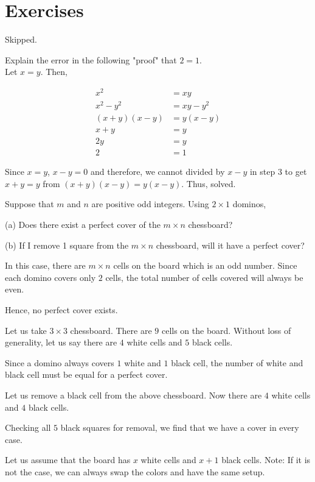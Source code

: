 \section*{Exercises}

\bp Skipped.\ep 

\bp 
  Explain the error in the following "proof" that $2 = 1$. \\
  Let $x = y$. Then,

\begin{align}
x^2 &= xy \\
x^2 - y^2 &= xy - y^2 \\
(x+y)(x-y) &= y(x-y) \\
x+y &= y \\
2y &= y \\
2 &= 1
\end{align}
\ep 

\bs
  Since $x = y$, $x-y = 0$ and therefore, we cannot divided by $x-y$ in step $3$ to get $x+y = y$ from $(x+y)(x-y) = y(x-y)$. Thus, solved.
\es


\bp 
  Suppose that $m$ and $n$ are positive odd integers. Using $2 \times 1$ dominos,

  (a) Does there exist a perfect cover of the $m \times n$ chessboard?

  (b) If I remove 1 square from the $m \times n$ chessboard, will it have a perfect cover?
\ep 

\bs[a]
  In this case, there are $m \times n$ cells on the board which is an odd number. Since each domino covers only $2$ cells, the total number of cells covered will always be even.

  Hence, no perfect cover exists.
\es

\begin{scratch}[b]
  Let us take $3 \times 3$ chessboard. There are $9$ cells on the board. Without loss of generality, let us say there are $4$ white cells and $5$ black cells.

  Since a domino always covers $1$ white and $1$ black cell, the number of white and black cell must be equal for a perfect cover.

  Let us remove a black cell from the above chessboard. Now there are $4$ white cells and $4$ black cells.

  Checking all $5$ black squares for removal, we find that we have a cover in every case.
\end{scratch}

\bs[b]
  Let us assume that the board has $x$ white cells and $x+1$ black cells.
	Note: If it is not the case, we can always swap the colors and have the same setup.

